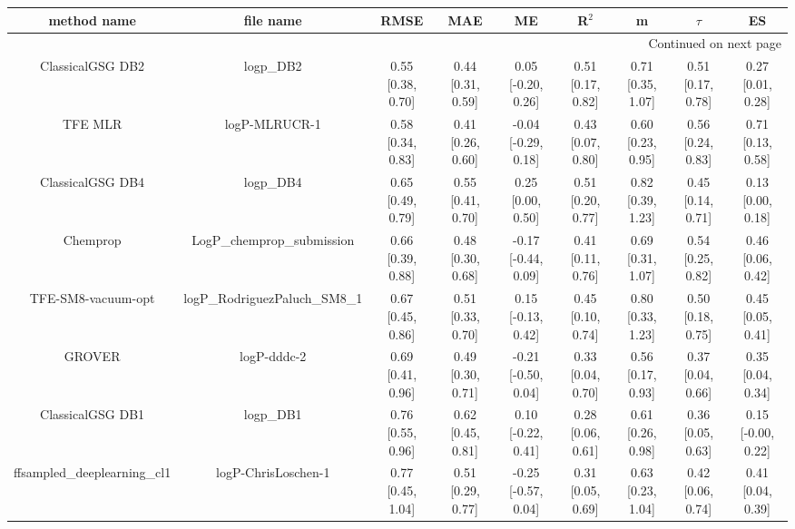 \documentclass{article}
\begin{document}
\begin{center}
\scriptsize
\begin{longtable}{|ccccccccc|}
\toprule
                  method name &                                      file name &               RMSE &                MAE &                    ME &              R$^2$ &                     m &                $\tau$ &                    ES \\
\midrule
\endhead
\midrule
\multicolumn{9}{r}{{Continued on next page}} \\
\midrule
\endfoot

\bottomrule
\endlastfoot
             ClassicalGSG DB2 &                                      logp\_DB2 &  0.55 [0.38, 0.70] &  0.44 [0.31, 0.59] &    0.05 [-0.20, 0.26] &  0.51 [0.17, 0.82] &     0.71 [0.35, 1.07] &     0.51 [0.17, 0.78] &     0.27 [0.01, 0.28] \\
                      TFE MLR &                                  logP-MLRUCR-1 &  0.58 [0.34, 0.83] &  0.41 [0.26, 0.60] &   -0.04 [-0.29, 0.18] &  0.43 [0.07, 0.80] &     0.60 [0.23, 0.95] &     0.56 [0.24, 0.83] &     0.71 [0.13, 0.58] \\
             ClassicalGSG DB4 &                                      logp\_DB4 &  0.65 [0.49, 0.79] &  0.55 [0.41, 0.70] &     0.25 [0.00, 0.50] &  0.51 [0.20, 0.77] &     0.82 [0.39, 1.23] &     0.45 [0.14, 0.71] &     0.13 [0.00, 0.18] \\
                     Chemprop &                     LogP\_chemprop\_submission &  0.66 [0.39, 0.88] &  0.48 [0.30, 0.68] &   -0.17 [-0.44, 0.09] &  0.41 [0.11, 0.76] &     0.69 [0.31, 1.07] &     0.54 [0.25, 0.82] &     0.46 [0.06, 0.42] \\
           TFE-SM8-vacuum-opt &                  logP\_RodriguezPaluch\_SM8\_1 &  0.67 [0.45, 0.86] &  0.51 [0.33, 0.70] &    0.15 [-0.13, 0.42] &  0.45 [0.10, 0.74] &     0.80 [0.33, 1.23] &     0.50 [0.18, 0.75] &     0.45 [0.05, 0.41] \\
                       GROVER &                                    logP-dddc-2 &  0.69 [0.41, 0.96] &  0.49 [0.30, 0.71] &   -0.21 [-0.50, 0.04] &  0.33 [0.04, 0.70] &     0.56 [0.17, 0.93] &     0.37 [0.04, 0.66] &     0.35 [0.04, 0.34] \\
             ClassicalGSG DB1 &                                      logp\_DB1 &  0.76 [0.55, 0.96] &  0.62 [0.45, 0.81] &    0.10 [-0.22, 0.41] &  0.28 [0.06, 0.61] &     0.61 [0.26, 0.98] &     0.36 [0.05, 0.63] &    0.15 [-0.00, 0.22] \\
   ffsampled_deeplearning_cl1 &                            logP-ChrisLoschen-1 &  0.77 [0.45, 1.04] &  0.51 [0.29, 0.77] &   -0.25 [-0.57, 0.04] &  0.31 [0.05, 0.69] &     0.63 [0.23, 1.04] &     0.42 [0.06, 0.74] &     0.41 [0.04, 0.39] \\

\end{longtable}
\end{center}
\end{document}
